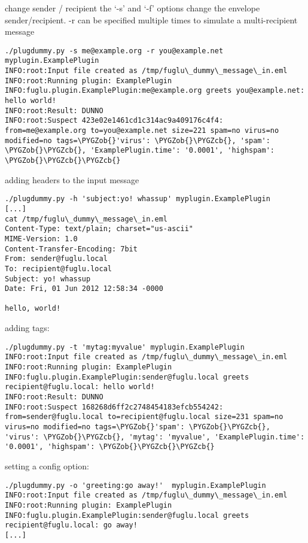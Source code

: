 \documentclass[letterpaper,10pt,english]{sphinxmanual}
\def\PYGZob{\char`\{}
\def\PYGZcb{\char`\}}
\begin{document}
change sender / recipient
the `-s' and `-f' options change the envelope sender/recipient. -r can be specified multiple times to simulate a multi-recipient message

\begin{Verbatim}[commandchars=\\\{\}]
./plugdummy.py -s me@example.org -r you@example.net  myplugin.ExamplePlugin
INFO:root:Input file created as /tmp/fuglu\_dummy\_message\_in.eml
INFO:root:Running plugin: ExamplePlugin
INFO:fuglu.plugin.ExamplePlugin:me@example.org greets you@example.net: hello world!
INFO:root:Result: DUNNO
INFO:root:Suspect 423e02e1461cd1c314ac9a409176c4f4: from=me@example.org to=you@example.net size=221 spam=no virus=no modified=no tags=\PYGZob{}'virus': \PYGZob{}\PYGZcb{}, 'spam': \PYGZob{}\PYGZcb{}, 'ExamplePlugin.time': '0.0001', 'highspam': \PYGZob{}\PYGZcb{}\PYGZcb{}
\end{Verbatim}

adding headers to the input message

\begin{Verbatim}[commandchars=\\\{\}]
./plugdummy.py -h 'subject:yo! whassup' myplugin.ExamplePlugin
[...]
cat /tmp/fuglu\_dummy\_message\_in.eml
Content-Type: text/plain; charset="us-ascii"
MIME-Version: 1.0
Content-Transfer-Encoding: 7bit
From: sender@fuglu.local
To: recipient@fuglu.local
Subject: yo! whassup
Date: Fri, 01 Jun 2012 12:58:34 -0000

hello, world!
\end{Verbatim}

adding tags:

\begin{Verbatim}[commandchars=\\\{\}]
./plugdummy.py -t 'mytag:myvalue' myplugin.ExamplePlugin
INFO:root:Input file created as /tmp/fuglu\_dummy\_message\_in.eml
INFO:root:Running plugin: ExamplePlugin
INFO:fuglu.plugin.ExamplePlugin:sender@fuglu.local greets recipient@fuglu.local: hello world!
INFO:root:Result: DUNNO
INFO:root:Suspect 168268d6ff2c2748454183efcb554242: from=sender@fuglu.local to=recipient@fuglu.local size=231 spam=no virus=no modified=no tags=\PYGZob{}'spam': \PYGZob{}\PYGZcb{}, 'virus': \PYGZob{}\PYGZcb{}, 'mytag': 'myvalue', 'ExamplePlugin.time': '0.0001', 'highspam': \PYGZob{}\PYGZcb{}\PYGZcb{}
\end{Verbatim}

setting a config option:

\begin{Verbatim}[commandchars=\\\{\}]
./plugdummy.py -o 'greeting:go away!'  myplugin.ExamplePlugin
INFO:root:Input file created as /tmp/fuglu\_dummy\_message\_in.eml
INFO:root:Running plugin: ExamplePlugin
INFO:fuglu.plugin.ExamplePlugin:sender@fuglu.local greets recipient@fuglu.local: go away!
[...]
\end{Verbatim}
\end{document}
